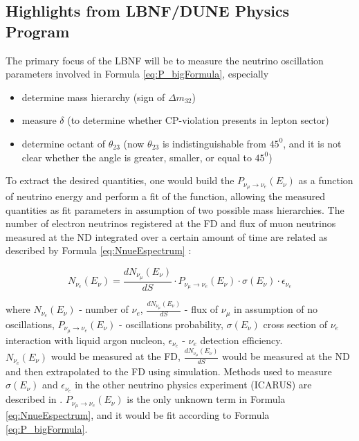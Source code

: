 \subsection{Highlights from LBNF/DUNE Physics Program}

The primary focus of the LBNF will be to measure the neutrino oscillation parameters involved in Formula \ref{eq:P_bigFormula}, especially 
\begin{itemize}
\item determine mass hierarchy (sign of $\Delta{m_{32}}$)
\item measure $\delta$ (to determine whether CP-violation presents in lepton sector)
\item determine octant of $\theta_{23}$ (now $\theta_{23}$ is indistinguishable from $45^0$, and it is not clear whether the angle is greater, smaller, or equal to $45^0$)
\end{itemize}

To extract the desired quantities, one would build the $P_{\nu_\mu \rightarrow \nu_e}(E_{\nu})$ as a function of neutrino energy and perform a fit of the function, allowing the measured quantities as fit parameters in assumption of two possible mass hierarchies. The number of electron neutrinos registered at the FD and flux of muon neutrinos measured at the ND integrated over a certain amount of time are related as described by Formula \ref{eq:NnueEspectrum} \cite{ref_LisaWhitehead}: \\

\begin{center}
\begin{equation}
\label{eq:NnueEspectrum}
N_{\nu_e}(E_{\nu}) = \frac{dN_{\nu_\mu}(E_{\nu})}{dS} \cdot P_{\nu_\mu \rightarrow \nu_e}(E_{\nu}) \cdot \sigma(E_{\nu}) \cdot \epsilon_{\nu_e} 
\end{equation}
\end{center}
where $N_{\nu_e}(E_{\nu})$ - number of $\nu_e$, $\frac{dN_{\nu_\mu}(E_{\nu})}{dS}$ - flux of $\nu_\mu$ in assumption of no oscillations, $P_{\nu_\mu \rightarrow \nu_e}(E_{\nu})$ - oscillations probability, $\sigma(E_{\nu})$ cross section of $\nu_e$ interaction with liquid argon nucleon, $\epsilon_{\nu_e}$ - $\nu_e$ detection efficiency.\\

$N_{\nu_e}(E_{\nu})$ would be measured at the FD, $\frac{dN_{\nu_\mu}(E_{\nu})}{dS}$ would be measured at the ND and then extrapolated to the FD using simulation. Methods used to measure $\sigma(E_{\nu})$ and $\epsilon_{\nu_e}$ in the other neutrino physics experiment (ICARUS) are described in \cite{ref_eff_ICARUS}. $P_{\nu_\mu \rightarrow \nu_e}(E_{\nu})$ is the only unknown term in Formula \ref{eq:NnueEspectrum}, and it would be fit according to Formula \ref{eq:P_bigFormula}.\\

